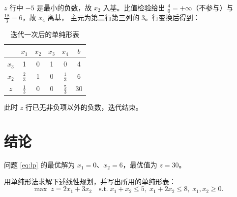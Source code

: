 $z$ 行中 $-5$ 是最小的负数，故 $x_2$ 入基。比值检验给出
$\frac{4}{0} = +\infty$（不参与）与 $\frac{18}{3} = 6$，故 $x_4$ 离基，
主元为第二行第三列的 $3$。行变换后得到：

\begin{table}[htbp]
  \centering
  \caption{迭代一次后的单纯形表}
  \label{tab:simplex-1}
  \begin{tabular}{c|ccccc}
    \toprule
    & $x_1$ & $x_2$ & $x_3$ & $x_4$ & $b$ \\
    \midrule
    $x_3$ & 1 & 0 & 1 & 0 & 4 \\
    $x_2$ & $\frac{2}{3}$ & 1 & 0 & $\frac{1}{3}$ & 6 \\
    \midrule
    $z$  & $\frac{1}{3}$ & 0 & 0 & $\frac{5}{3}$ & 30 \\
    \bottomrule
  \end{tabular}
\end{table}

此时 $z$ 行已无非负项以外的负数，迭代结束。

\section{结论}

\begin{conclusion}
问题 \eqref{eq:lp} 的最优解为 $x_1 = 0$、$x_2 = 6$，最优值为 $z = 30$。
\end{conclusion}

\begin{exercise}
用单纯形法求解下述线性规划，并写出所用的单纯形表：
\begin{equation}
  \max\; z = 2x_1 + 3x_2 \quad
  \mathrm{s.t.}\; x_1 + x_2 \leq 5,\; x_1 + 2x_2 \leq 8,\; x_1, x_2 \geq 0.
\end{equation}
\end{exercise}

